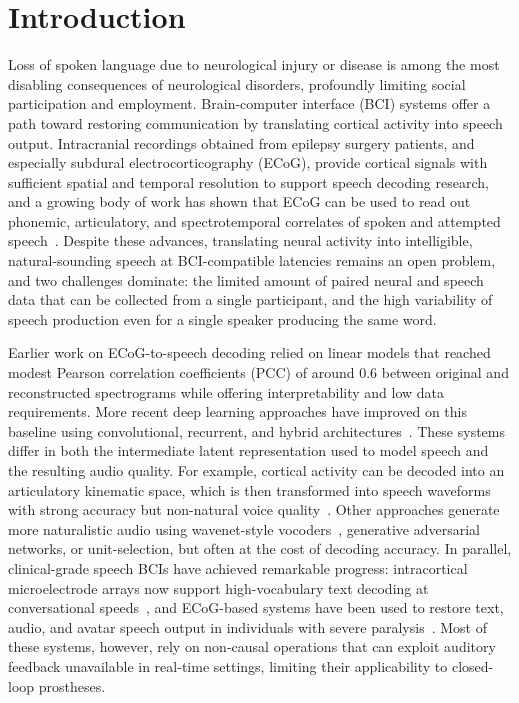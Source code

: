 \section{Introduction}

Loss of spoken language due to neurological injury or disease is among the most disabling consequences of neurological disorders, profoundly limiting social participation and employment. Brain-computer interface (BCI) systems offer a path toward restoring communication by translating cortical activity into speech output. Intracranial recordings obtained from epilepsy surgery patients, and especially subdural electrocorticography (ECoG), provide cortical signals with sufficient spatial and temporal resolution to support speech decoding research, and a growing body of work has shown that ECoG can be used to read out phonemic, articulatory, and spectrotemporal correlates of spoken and attempted speech~\cite{pasley2012reconstructing,bouchard2014control,mugler2014direct,herff2015brain,flinker2015redefining,wang2021dynamics}. Despite these advances, translating neural activity into intelligible, natural-sounding speech at BCI-compatible latencies remains an open problem, and two challenges dominate: the limited amount of paired neural and speech data that can be collected from a single participant, and the high variability of speech production even for a single speaker producing the same word.

Earlier work on ECoG-to-speech decoding relied on linear models that reached modest Pearson correlation coefficients (PCC) of around $0.6$ between original and reconstructed spectrograms while offering interpretability and low data requirements. More recent deep learning approaches have improved on this baseline using convolutional, recurrent, and hybrid architectures~\cite{akbari2019towards,anumanchipalli2019speech,makin2020machine}. These systems differ in both the intermediate latent representation used to model speech and the resulting audio quality. For example, cortical activity can be decoded into an articulatory kinematic space, which is then transformed into speech waveforms with strong accuracy but non-natural voice quality~\cite{anumanchipalli2019speech}. Other approaches generate more naturalistic audio using wavenet-style vocoders~\cite{akbari2019towards}, generative adversarial networks, or unit-selection, but often at the cost of decoding accuracy. In parallel, clinical-grade speech BCIs have achieved remarkable progress: intracortical microelectrode arrays now support high-vocabulary text decoding at conversational speeds~\cite{willett2023highperformance}, and ECoG-based systems have been used to restore text, audio, and avatar speech output in individuals with severe paralysis~\cite{moses2021neuroprosthesis,metzger2023highperformance,silva2024bilingual}. Most of these systems, however, rely on non-causal operations that can exploit auditory feedback unavailable in real-time settings, limiting their applicability to closed-loop prostheses.

